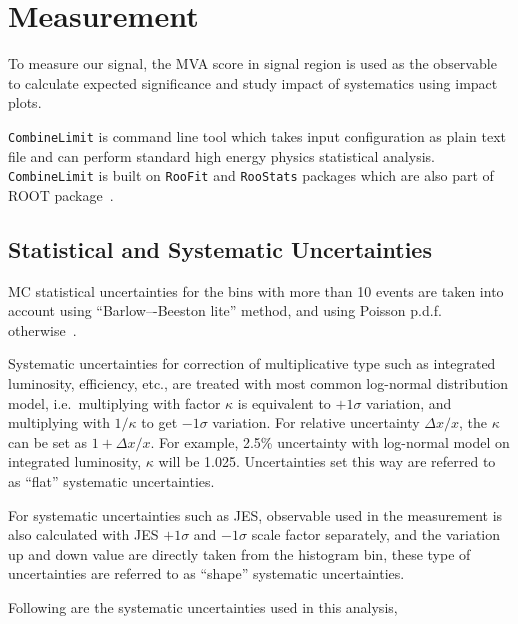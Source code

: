 \section{
  Measurement
 }

To measure our signal,
the \gls{MVA} score in signal region is used as the observable to
calculate expected significance and study impact of systematics
using impact plots.

\verb|CombineLimit| is command line tool which takes input
configuration as plain text file and can perform
standard high energy physics statistical analysis. \verb|CombineLimit|
is built on \verb|RooFit| and \verb|RooStats| packages which
are also part of ROOT package~\cite{Verkerke2003,Moneta2010}.

\subsection{
  Statistical and Systematic Uncertainties
}

\gls{MC} statistical uncertainties for the bins with more than 10 events
are taken into account using ``Barlow–-Beeston lite'' method,
and using Poisson \gls{p.d.f.} otherwise~\cite{Barlow1993}.

Systematic uncertainties
for correction of multiplicative type such as integrated luminosity, efficiency, etc.,
are treated with most common log-normal distribution model,
i.e.~multiplying with factor \( \kappa \) is equivalent to
\( +1 \sigma \) variation, and
multiplying with \( 1/\kappa \) to get \( -1\sigma \) variation. For relative
uncertainty \(\Delta x / x \), the \( \kappa \) can be set as \( 1 + \Delta x / x \).
For example, 2.5\% uncertainty with log-normal model on integrated luminosity,
\( \kappa \) will be 1.025. Uncertainties set this way
are referred to as ``flat'' systematic uncertainties.

For systematic uncertainties such as \gls{JES}, observable
used in the measurement is also calculated with \gls{JES} \( +1\sigma \)
and \( -1\sigma \) scale factor separately, and the variation up and down
value are directly taken from the histogram bin, these type of uncertainties
are referred to as ``shape'' systematic uncertainties.

Following are the systematic uncertainties used in this analysis,

